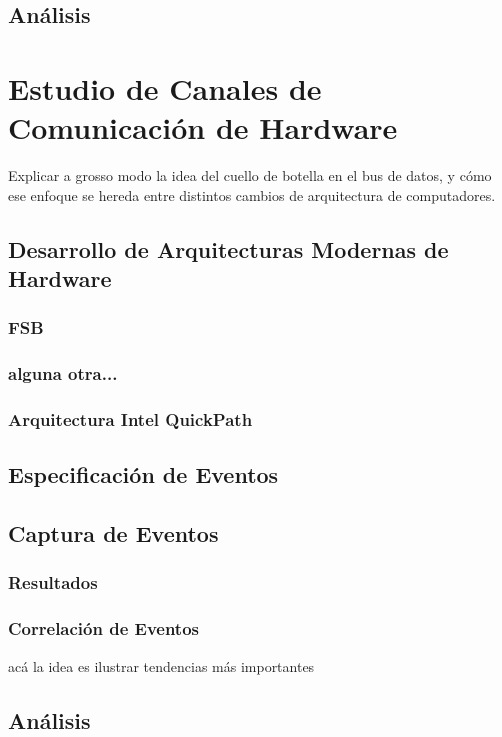 \subsection{Análisis}

\section{Estudio de Canales de Comunicación de Hardware}

Explicar a grosso modo la idea del cuello de botella en el bus de datos, y cómo ese enfoque se hereda entre distintos cambios de arquitectura de computadores.

\subsection{Desarrollo de Arquitecturas Modernas de Hardware}
\subsubsection{FSB}
\subsubsection{alguna otra...}
\subsubsection{Arquitectura Intel QuickPath}

\subsection{Especificación de Eventos}
\subsection{Captura de Eventos}
\subsubsection{Resultados}
\subsubsection{Correlación de Eventos}
acá la idea es ilustrar tendencias más importantes
\subsection{Análisis}

